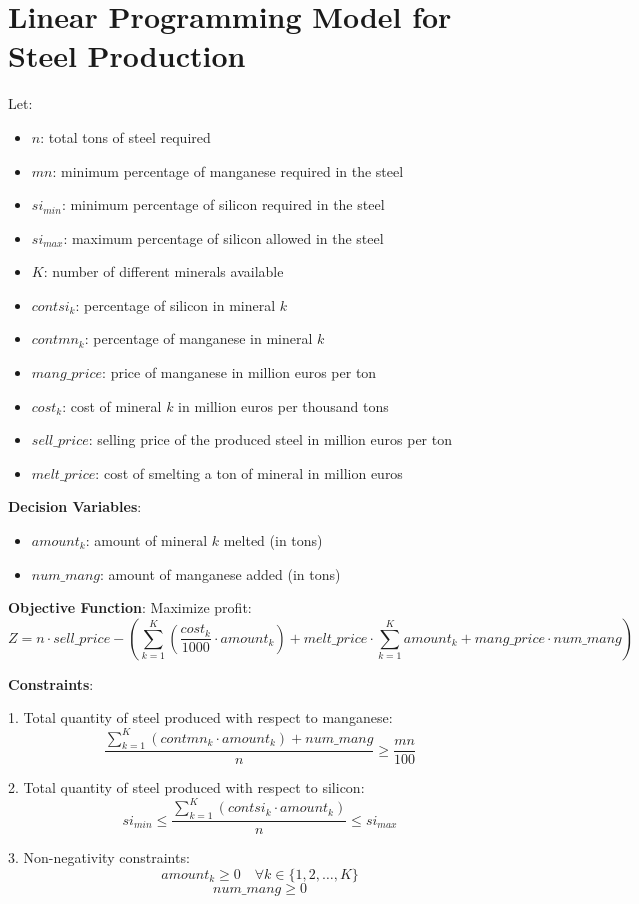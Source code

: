 \documentclass{article}
\begin{document}
\section*{Linear Programming Model for Steel Production}

Let:
\begin{itemize}
    \item \( n \): total tons of steel required
    \item \( mn \): minimum percentage of manganese required in the steel
    \item \( si_{min} \): minimum percentage of silicon required in the steel
    \item \( si_{max} \): maximum percentage of silicon allowed in the steel
    \item \( K \): number of different minerals available
    \item \( contsi_k \): percentage of silicon in mineral \( k \)
    \item \( contmn_k \): percentage of manganese in mineral \( k \)
    \item \( mang\_price \): price of manganese in million euros per ton
    \item \( cost_k \): cost of mineral \( k \) in million euros per thousand tons
    \item \( sell\_price \): selling price of the produced steel in million euros per ton
    \item \( melt\_price \): cost of smelting a ton of mineral in million euros
\end{itemize}

\textbf{Decision Variables}:
\begin{itemize}
    \item \( amount_k \): amount of mineral \( k \) melted (in tons)
    \item \( num\_mang \): amount of manganese added (in tons)
\end{itemize}

\textbf{Objective Function}:
Maximize profit:
\[
Z = n \cdot sell\_price - \left( \sum_{k=1}^{K} ( \frac{cost_k}{1000} \cdot amount_k ) + melt\_price \cdot \sum_{k=1}^{K} amount_k + mang\_price \cdot num\_mang \right)
\]

\textbf{Constraints}:

1. Total quantity of steel produced with respect to manganese:
\[
\frac{\sum_{k=1}^{K} (contmn_k \cdot amount_k) + num\_mang}{n} \geq \frac{mn}{100}
\]

2. Total quantity of steel produced with respect to silicon:
\[
si_{min} \leq \frac{\sum_{k=1}^{K} (contsi_k \cdot amount_k)}{n} \leq si_{max}
\]

3. Non-negativity constraints:
\[
amount_k \geq 0 \quad \forall k \in \{1, 2, \ldots, K\}
\]
\[
num\_mang \geq 0
\]
\end{document}
